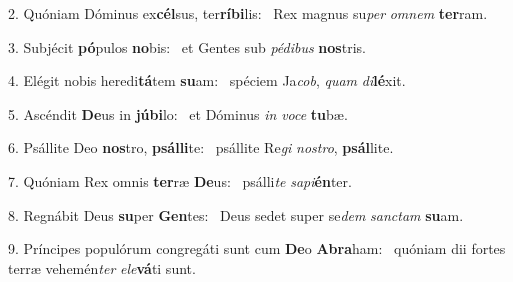 2. Quóniam Dóminus ex\textbf{cél}sus, ter\textbf{rí}\textbf{bi}lis: \ast\  Rex magnus su\textit{per} \textit{om}\textit{nem} \textbf{ter}ram.\

3. Subjécit \textbf{pó}pulos \textbf{no}bis: \ast\  et Gentes sub \textit{pé}\textit{di}\textit{bus} \textbf{nos}tris.\

4. Elégit nobis heredi\textbf{tá}tem \textbf{su}am: \ast\  spéciem Ja\textit{cob}, \textit{quam} \textit{di}\textbf{lé}xit.\

5. Ascéndit \textbf{De}us in \textbf{jú}\textbf{bi}lo: \ast\  et Dóminus \textit{in} \textit{vo}\textit{ce} \textbf{tu}bæ.\

6. Psállite Deo \textbf{nos}tro, \textbf{psál}\textbf{li}te: \ast\  psállite Re\textit{gi} \textit{nos}\textit{tro}, \textbf{psál}lite.\

7. Quóniam Rex omnis \textbf{ter}ræ \textbf{De}us: \ast\  psálli\textit{te} \textit{sa}\textit{pi}\textbf{én}ter.\

8. Regnábit Deus \textbf{su}per \textbf{Gen}tes: \ast\  Deus sedet super se\textit{dem} \textit{sanc}\textit{tam} \textbf{su}am.\

9. Príncipes populórum congregáti sunt cum \textbf{De}o \textbf{A}\textbf{bra}ham: \ast\  quóniam dii fortes terræ vehemén\textit{ter} \textit{e}\textit{le}\textbf{vá}ti sunt.\

